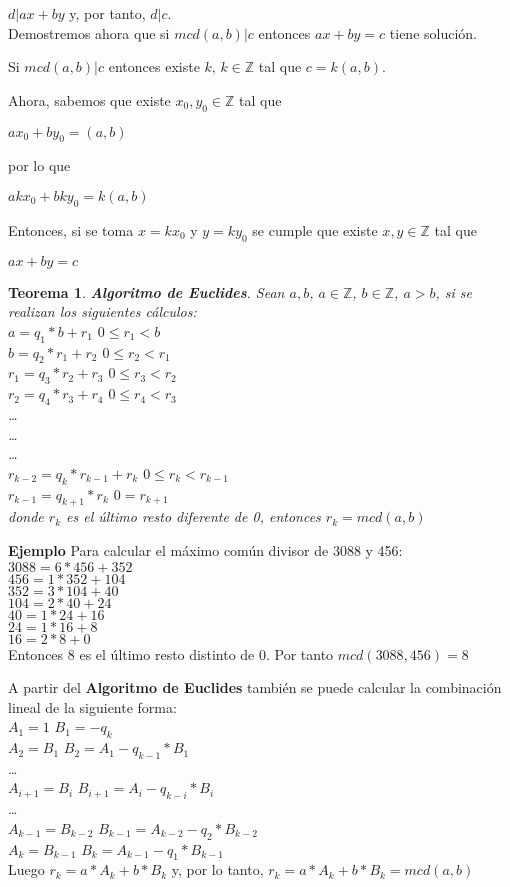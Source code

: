 \documentclass[a4paper,1pt]{report}
\newtheorem*{teo}{Teorema}
\begin{document}
$d|ax+by$ y, por tanto, $d|c$.
\\

Demostremos ahora que si $mcd(a,b)|c$ entonces $ax+by=c$ tiene solución.

Si $mcd(a,b)|c$ entonces existe $k,\, k\in\mathbb{Z}$ tal que $c=k(a,b)$.

Ahora, sabemos que existe $x_0,y_0\in\mathbb{Z}$ tal que

$ax_0+by_0=(a,b)$

por lo que

$akx_0+bky_0=k(a,b)$

Entonces, si se toma $x=kx_0$ y $y=ky_0$ se cumple que existe $x,y\in\mathbb{Z}$ tal que 

$ax+by=c$


\newpage
\begin{teo}
 \textbf{Algoritmo de Euclides}. Sean $a,b$, $a\in\mathbb{Z}$, $b\in\mathbb{Z}$, $a>b$, si se realizan los siguientes cálculos:\\
 $a=q_1*b+r_1$ $0\leq r_1<b$\\
 $b=q_2*r_1+r_2$  $0\leq r_2<r_1$\\
 $r_1=q_3*r_2+r_3$ $0\leq r_3<r_2$\\
 $r_2=q_4*r_3+r_4$ $0\leq r_4<r_3$\\
 \dots\\
 \dots\\
 \dots\\
 $r_{k-2}=q_k*r_{k-1}+r_k$ $0\leq r_k<r_{k-1}$\\
 $r_{k-1}=q_{k+1}*r_{k}$ $0=r_{k+1}$\\
 donde $r_k$ es el último resto diferente de 0, entonces $r_k=mcd(a,b)$
\end{teo}

\textbf{Ejemplo}
Para calcular el máximo común divisor de 3088 y 456:\\
$3088=6*456+352$\\
$456=1*352+104$\\
$352=3*104+40$\\
$104=2*40+24$\\
$40=1*24+16$\\
$24=1*16+8$\\
$16=2*8 + 0$\\
Entonces 8 es el último resto distinto de 0. Por tanto $mcd(3088,456)=8$

A partir del \textbf{Algoritmo de Euclides} también se puede calcular la combinación lineal de la siguiente forma:\\
$A_1=1$ $B_1=-q_k$\\
$A_2=B_1$ $B_2=A_1-q_{k-1}*B_1$\\
\dots\\
$A_{i+1}=B_i$ $B_{i+1}=A_i-q_{k-i}*B_i$\\
\dots\\
$A_{k-1}=B_{k-2}$ $B_{k-1}=A_{k-2}-q_2*B_{k-2}$\\
$A_{k}=B_{k-1}$ $B_{k}=A_{k-1}-q_1*B_{k-1}$\\
Luego $r_k=a*A_k+b*B_k$ y, por lo tanto, $r_k=a*A_k+b*B_k=mcd(a,b)$
\end{document}

